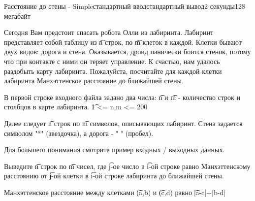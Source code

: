 \begin{problem}{Расстояние до стены - Simple}{стандартный ввод}{стандартный вывод}{2 секунды}{128 мегабайт}

Сегодня Вам предстоит спасать робота Олли из лабиринта. Лабиринт представляет собой таблицу из \t{n} строк, по \t{m} клеток в каждой. Клетки бывают двух видов: дорога и стена.
Оказывается, дроид панически боится стенок, потому что при контакте с ними он теряет управление. К счастью, нам удалось раздобыть карту лабиринта. Пожалуйста, посчитайте для каждой клетки лабиринта Манхэттенское расстояние до ближайшей стены.



\InputFile
В первой строке входного файла задано два числа: \t{n} и \t{m} - количество строк и столбцов в карте лабиринта. \t{1 <= n,m <= 200}

Далее следует \t{n} строк по \t{m} символов, описывающих лабиринт. Стена задается символом "*" (звездочка), а дорога - " " (пробел).

Для большего понимания смотрите пример входных / выходных данных.

\OutputFile
Выведите \t{n} строк по \t{m} чисел, где \t{j}-ое число в \t{i}-ой строке равно Манхэттенскому расстоянию от \t{j}-ой клетки в \t{i}-ой строке лабиринта до ближайшей стены.


\Note
Манхэттенское расстояние между клетками \t{(a,b)} и \t{(c,d)} равно \t{|a-c|+|b-d|}

\end{problem}

